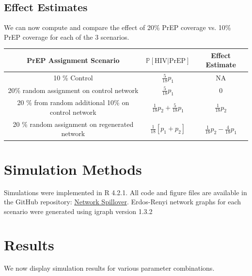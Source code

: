 \documentclass{article}
\theoremstyle{definition}
\begin{document}
\subsection{Effect Estimates}
We can now compute and compare the effect of 20\% PrEP coverage vs. 10\% PrEP coverage for each of the 3 scenarios.
\begin{center}
    \begin{tabular}{|c|c|c|}
    \hline
    PrEP Assignment Scenario     & $\mathbb{P}\left[\text{HIV} \vert \text{PrEP}\right]$ &  Effect Estimate  \\
         \hline
      10 \% Control   & $\frac{5}{18}p_{1}$ & NA\\
      \hline
      20\% random assignment on control network & $\frac{5}{18}p_{1}$ & 0 \\
      \hline
      20 \% from random additional 10\% on control network & $\frac{1}{18}p_{2}+\frac{5}{18}p_{1}$ & $\frac{1}{18}p_{2}$\\
      \hline
      20 \% random assignment on regenerated network & $\frac{1}{18}\left[p_{1}+p_{2}\right]$ & $\frac{1}{18}p_{2}-\frac{4}{18}p_{1}$\\
      \hline                 
    \end{tabular}                                      \end{center}
\section{Simulation Methods}
Simulations were implemented in R 4.2.1. All code and figure files are available in the GitHub repository: \href{https://github.com/nico-dangelo/Network-Spillover}{Network Spillover}.
Erdos-Renyi network graphs for each scenario were generated using igraph version 1.3.2
\section{Results}
We now display simulation results for various parameter combinations.
\end{document}
